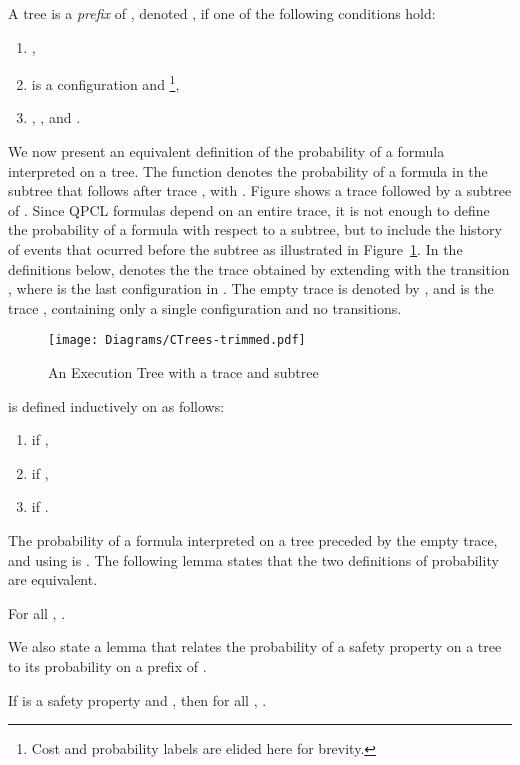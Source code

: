 \begin{definition}
A tree  is a \emph{prefix} of , denoted , if
one of the following conditions hold:
\begin{enumerate}
  \item ,
  \item  is a configuration  and \footnote{
   Cost and probability labels are elided here for brevity. },
  \item ,
,
    and .
\end{enumerate}
\end{definition}

We now present an equivalent definition of the probability of a
formula interpreted on a tree. The function 
denotes the probability of a formula  in the subtree
 that follows after trace , with \valuations . Figure
 shows a trace  followed by a subtree 
of . Since QPCL formulas depend on an entire trace, it is not enough to
define the probability of a formula with respect to a subtree, but to include
the history of events that ocurred before the subtree as illustrated in
Figure~\ref{fig:prob}. In the definitions below, 
denotes the the trace obtained by extending  with the transition
, where  is the last configuration in .
The empty trace is denoted by , and  is the
trace , containing only a single configuration and no transitions.

\begin{figure}
  \centering
		\texttt{[image: Diagrams/CTrees-trimmed.pdf]}
        \caption{An Execution Tree with a trace  and subtree }
   \label{fig:prob}
 \end{figure}


\begin{definition}[Probability]
 is defined inductively on 
as follows:
\begin{enumerate}
\item  if ,
\item  if ,
\item 
   if .
\end{enumerate}
\end{definition}

The probability of a formula  interpreted on a tree 
preceded by
 the empty trace, and using
\valuation  is .
The following lemma states
 that the two definitions of probability are equivalent.
\begin{lemma}
\label{lemma:ind-equiv}
For all \valuations ,
.
\end{lemma}

We also state a lemma that relates the probability of a safety
property on a tree  to its probability on a prefix of .
\begin{lemma}
\label{lemma:safety-prefix}
If  is a safety property and ,  then
for all ,
.
\end{lemma}


